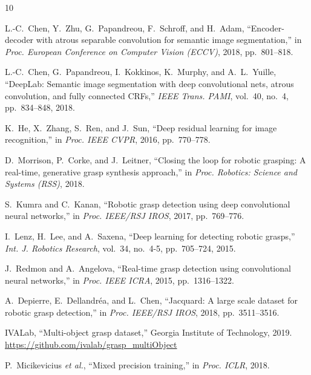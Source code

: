 \documentclass[12pt, a4paper]{article}
\begin{document}
\begin{thebibliography}{10}

L.-C.~Chen, Y.~Zhu, G.~Papandreou, F.~Schroff, and H.~Adam,
``Encoder-decoder with atrous separable convolution for semantic image segmentation,''
in \textit{Proc. European Conference on Computer Vision (ECCV)}, 2018, pp.~801--818.

L.-C.~Chen, G.~Papandreou, I.~Kokkinos, K.~Murphy, and A.~L.~Yuille,
``DeepLab: Semantic image segmentation with deep convolutional nets, atrous convolution, and fully connected CRFs,''
\textit{IEEE Trans. PAMI}, vol.~40, no.~4, pp.~834--848, 2018.

K.~He, X.~Zhang, S.~Ren, and J.~Sun,
``Deep residual learning for image recognition,''
in \textit{Proc. IEEE CVPR}, 2016, pp.~770--778.

D.~Morrison, P.~Corke, and J.~Leitner,
``Closing the loop for robotic grasping: A real-time, generative grasp synthesis approach,''
in \textit{Proc. Robotics: Science and Systems (RSS)}, 2018.

S.~Kumra and C.~Kanan,
``Robotic grasp detection using deep convolutional neural networks,''
in \textit{Proc. IEEE/RSJ IROS}, 2017, pp.~769--776.

I.~Lenz, H.~Lee, and A.~Saxena,
``Deep learning for detecting robotic grasps,''
\textit{Int. J. Robotics Research}, vol.~34, no.~4-5, pp.~705--724, 2015.

J.~Redmon and A.~Angelova,
``Real-time grasp detection using convolutional neural networks,''
in \textit{Proc. IEEE ICRA}, 2015, pp.~1316--1322.

A.~Depierre, E.~Dellandr\'{e}a, and L.~Chen,
``Jacquard: A large scale dataset for robotic grasp detection,''
in \textit{Proc. IEEE/RSJ IROS}, 2018, pp.~3511--3516.

IVALab, ``Multi-object grasp dataset,''
Georgia Institute of Technology, 2019.
\url{https://github.com/ivalab/grasp_multiObject}

P.~Micikevicius \textit{et al.},
``Mixed precision training,''
in \textit{Proc. ICLR}, 2018.

\end{thebibliography}
\end{document}
